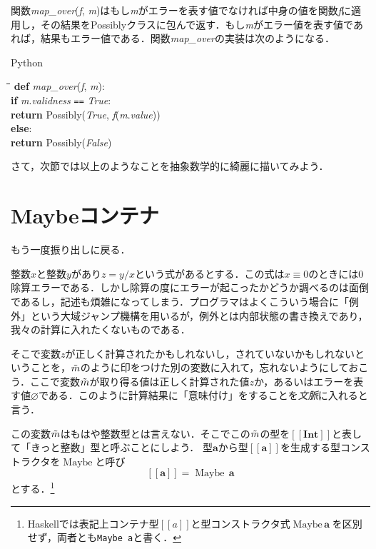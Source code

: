 \documentclass[twocolumn]{jsbook}
\def\[{[\![}
\def\]{]\!]}
\newcommand{\keyword}[1]{{\emph{#1}}}
\newcommand{\code}[1]{\texttt{#1}}
\newenvironment{pythoncode}{\begin{itembox}[r]{Python}}{\end{itembox}}
\newenvironment{python}{\begin{tabbing}\hspace*{1em}\=\hspace*{1em}\=\hspace*{1em}\=\hspace*{1em}\=\kill}{\end{tabbing}}
\newcommand{\pthnId}[1]{\textit{#1}}
\newcommand{\pthnKeyword}[1]{\textbf{#1}}
\newcommand{\pthnOp}[1]{\texttt{#1}}
\newcommand{\hsklType}[1]{\textbf{#1}}
\newcommand{\hsklTypeConstructor}[1]{\mathop{\mathrm{#1}}}
\DeclareMathOperator{\hsklMaybeConstructor}{\hsklTypeConstructor{Maybe}}
\newcommand{\hsklInt}{\hsklType{Int}}
\newcommand{\hsklNothing}{\varnothing}
\newcommand{\hsklMaybe}[1]{\Tilde{#1}}
\newcommand{\hsklMaybeType}[1]{\[#1\]}
\newcommand{\hsklTypeConstruct}[2]{#1\,#2}
\begin{document}
関数\pthnId{map\_over}(\pthnId{f}, \pthnId{m})はもし\pthnId{m}がエラーを表す値でなければ中身の値を関数\pthnId{f}に適用し，その結果をPossiblyクラスに包んで返す．もし\pthnId{m}がエラー値を表す値であれば，結果もエラー値である．関数\pthnId{map\_over}の実装は次のようになる．
\begin{pythoncode}
\begin{python}
\pthnKeyword{def} \pthnId{map\_over}(\pthnId{f}, \pthnId{m}):\\
\>\pthnKeyword{if} \pthnId{m}.\pthnId{validness} \pthnOp{==} \pthnId{True}:\\
\>\>\pthnKeyword{return} Possibly(\pthnId{True}, \pthnId{f}(\pthnId{m}.\pthnId{value}))\\
\>\pthnKeyword{else}:\\
\>\>\pthnKeyword{return} Possibly(\pthnId{False})
\end{python}
\end{pythoncode}

さて，次節では以上のようなことを抽象数学的に綺麗に描いてみよう．

\section{Maybeコンテナ}

もう一度振り出しに戻る．

整数$x$と整数$y$があり$z=y/x$という式があるとする．この式は$x\equiv0$のときには$0$除算エラーである．しかし除算の度にエラーが起こったかどうか調べるのは面倒であるし，記述も煩雑になってしまう．プログラマはよくこういう場合に「例外」という大域ジャンプ機構を用いるが，例外とは内部状態の書き換えであり，我々の計算に入れたくないものである．

そこで変数$z$が正しく計算されたかもしれないし，されていないかもしれないということを，$\hsklMaybe{m}$のように印をつけた別の変数に入れて，忘れないようにしておこう．ここで変数$\hsklMaybe{m}$が取り得る値は正しく計算された値$z$か，あるいはエラーを表す値$\hsklNothing$である．このように計算結果に「意味付け」をすることを\keyword{文脈}に入れると言う．

この変数$\hsklMaybe{m}$はもはや整数型とは言えない．そこでこの$\hsklMaybe{m}$の型を$\hsklMaybeType{\hsklInt}$と表して「きっと整数」型と呼ぶことにしよう．
型$\hsklType{a}$から型$\hsklMaybeType{\hsklType{a}}$を生成する型コンストラクタを$\hsklMaybeConstructor$と呼び$$\hsklMaybeType{\hsklType{a}}=\hsklTypeConstruct{\hsklMaybeConstructor}{\hsklType{a}}$$とする．\footnote{Haskellでは表記上コンテナ型$\hsklMaybeType{a}$と型コンストラクタ式$\hsklTypeConstruct{\hsklMaybeConstructor}{\hsklType{a}}$を区別せず，両者とも\code{Maybe a}と書く．}
\end{document}
